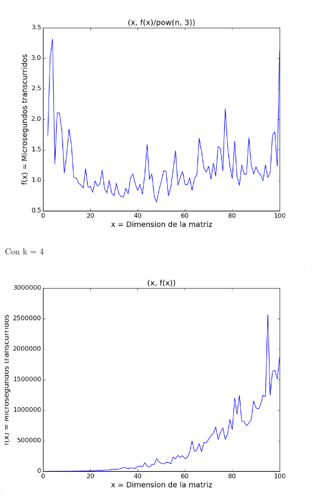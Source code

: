\begin{center}
\includegraphics[scale=0.54]{images/3potenciasobrecubo}
\end{center}


\vspace{2mm}

Con k = 4


\begin{center}
\includegraphics[scale=0.54]{images/4potenciafuncion}
\end{center}


